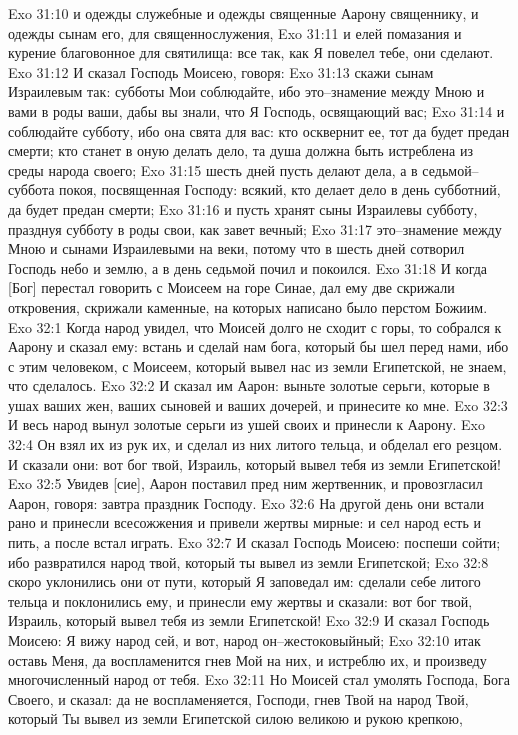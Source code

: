 Exo 31:10  и одежды служебные и одежды священные Аарону священнику, и одежды сынам его, для священнослужения,
Exo 31:11  и елей помазания и курение благовонное для святилища: все так, как Я повелел тебе, они сделают.
Exo 31:12  И сказал Господь Моисею, говоря:
Exo 31:13  скажи сынам Израилевым так: субботы Мои соблюдайте, ибо это--знамение между Мною и вами в роды ваши, дабы вы знали, что Я Господь, освящающий вас;
Exo 31:14  и соблюдайте субботу, ибо она свята для вас: кто осквернит ее, тот да будет предан смерти; кто станет в оную делать дело, та душа должна быть истреблена из среды народа своего;
Exo 31:15  шесть дней пусть делают дела, а в седьмой--суббота покоя, посвященная Господу: всякий, кто делает дело в день субботний, да будет предан смерти;
Exo 31:16  и пусть хранят сыны Израилевы субботу, празднуя субботу в роды свои, как завет вечный;
Exo 31:17  это--знамение между Мною и сынами Израилевыми на веки, потому что в шесть дней сотворил Господь небо и землю, а в день седьмой почил и покоился.
Exo 31:18  И когда [Бог] перестал говорить с Моисеем на горе Синае, дал ему две скрижали откровения, скрижали каменные, на которых написано было перстом Божиим.
Exo 32:1  Когда народ увидел, что Моисей долго не сходит с горы, то собрался к Аарону и сказал ему: встань и сделай нам бога, который бы шел перед нами, ибо с этим человеком, с Моисеем, который вывел нас из земли Египетской, не знаем, что сделалось.
Exo 32:2  И сказал им Аарон: выньте золотые серьги, которые в ушах ваших жен, ваших сыновей и ваших дочерей, и принесите ко мне.
Exo 32:3  И весь народ вынул золотые серьги из ушей своих и принесли к Аарону.
Exo 32:4  Он взял их из рук их, и сделал из них литого тельца, и обделал его резцом. И сказали они: вот бог твой, Израиль, который вывел тебя из земли Египетской!
Exo 32:5  Увидев [сие], Аарон поставил пред ним жертвенник, и провозгласил Аарон, говоря: завтра праздник Господу.
Exo 32:6  На другой день они встали рано и принесли всесожжения и привели жертвы мирные: и сел народ есть и пить, а после встал играть.
Exo 32:7  И сказал Господь Моисею: поспеши сойти; ибо развратился народ твой, который ты вывел из земли Египетской;
Exo 32:8  скоро уклонились они от пути, который Я заповедал им: сделали себе литого тельца и поклонились ему, и принесли ему жертвы и сказали: вот бог твой, Израиль, который вывел тебя из земли Египетской!
Exo 32:9  И сказал Господь Моисею: Я вижу народ сей, и вот, народ он--жестоковыйный;
Exo 32:10  итак оставь Меня, да воспламенится гнев Мой на них, и истреблю их, и произведу многочисленный народ от тебя.
Exo 32:11  Но Моисей стал умолять Господа, Бога Своего, и сказал: да не воспламеняется, Господи, гнев Твой на народ Твой, который Ты вывел из земли Египетской силою великою и рукою крепкою,
